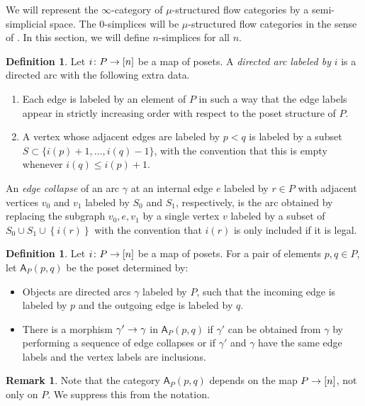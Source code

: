 \documentclass[10pt]{amsart}
\numberwithin{equation}{section}
\theoremstyle{definition}
\newtheorem{definition}[prop]{Definition}
\newtheorem{rem}[prop]{Remark}
\newcommand{\sfA}{\mathsf{A}}
\renewcommand{\to}{\mathchoice{\longrightarrow}{\rightarrow}{}{}}
\begin{document}
We will represent the $\infty$-category of $\mu$-structured flow categories by a semi-simplicial space. The 0-simplices will be $\mu$-structured flow categories in the sense of . In this section, we will define $n$-simplices for all $n$.

\begin{definition}\label{def:directed_arc_over_n}
	Let $i\colon P\to [n]$ be a map of posets.
	A \emph{directed arc labeled by} $i$ is a directed arc with the following extra data.
	\begin{enumerate}
		\item Each edge is labeled by an element of $P$ in such a way that the edge labels appear in strictly increasing order with respect to the poset structure of $P$.
		\item A vertex whose adjacent edges are labeled by $p<q$ is labeled by a subset $S\subset \{i(p)+1 , \dots, i(q)-1\}$, with the convention that this is empty whenever $i(q) \leq i(p)+1$.
	\end{enumerate}
	An \emph{edge collapse} of an arc $\gamma$ at an internal edge $e$ labeled by $r\in P$ with adjacent vertices $v_0$ and $ v_1$ labeled by $S_0$ and $S_1$, respectively, is the arc obtained by replacing the subgraph $v_0, e, v_1$ by a single vertex $v$ labeled by a subset of $S_0\cup S_1 \cup \left\{ i(r)\right\}$ with the convention that $i(r)$ is only included if it is legal.
\end{definition}

\begin{definition}\label{def:A_P_over_n}
	Let $i\colon P\to [n]$ be a map of posets.
	For a pair of elements $p,q\in P$, let $\sfA_P(p,q)$ be the poset determined by:
	\begin{itemize}
		\item Objects are directed arcs $\gamma$ labeled by $P$, such that the incoming edge is labeled by $p$ and the outgoing edge is labeled by $q$.
		\item  There is a morphism $\gamma' \to \gamma$ in $\sfA_{P}(p,q)$ if $\gamma'$ can be obtained from $\gamma$ by performing a sequence of edge collapses or if $\gamma'$ and $\gamma$ have the same edge labels and the vertex labels are inclusions.
	\end{itemize}
\end{definition}

\begin{rem}
	Note that the category $\sfA_{P}(p,q)$ depends on the map $P\to [n]$, not only on $P$. We suppress this from the notation.
\end{rem}
\end{document}
